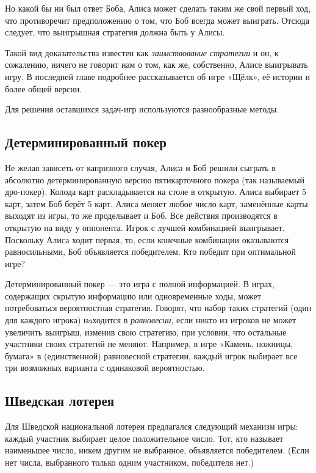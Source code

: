 Но какой бы ни был ответ Боба, Алиса может сделать таким же свой первый ход, что противоречит предположению о том, что Боб всегда может выиграть.
Отсюда следует,
что выигрышная стратегия должна быть у Алисы.
\heart

Такой вид доказательства известен как \emph{заимствование стратегии} и он, к сожалению, ничего не говорит нам о том, как же, собственно, Алисе выигрывать игру.
В последней главе подробнее рассказывается об игре «Щёлк», её истории и более общей версии.

\medskip

Для решения оставшихся задач-игр используются разнообразные методы.

\subsection*{Детерминированный покер}%

Не желая зависеть от капризного случая, Алиса и Боб решили сыграть в абсолютно детерминированную версию пятикарточного покера (так называемый дро-покер).
Колода карт раскладывается на столе в открытую.
Алиса выбирает 5 карт, затем Боб берёт 5 карт.
Алиса меняет любое число карт, заменённые карты выходят из игры, то же проделывает и Боб.
Все действия производятся в открытую на виду у оппонента.
Игрок с лучшей комбинацией выигрывает.
Поскольку Алиса ходит первая, то, если конечные комбинации оказываются равносильными, Боб объявляется победителем.
Кто победит при оптимальной игре?

\medskip

Детерминированный покер --- это игра с полной информацией.
В играх, содержащих скрытую информацию или одновременные ходы, может потребоваться вероятностная стратегия.
Говорят, что набор таких стратегий (один для каждого игрока) нaходится в \emph{равновесии}, если никто из игроков не может увеличить выигрыш, изменив свою стратегию, при условии, что остальные участники своих стратегий не меняют.
Например, в игре «Камень, ножницы, бумага» в (единственной) равновесной стратегии, каждый игрок выбирает все три возможных варианта с одинаковой вероятностью.

\subsection*{Шведская лотерея}%

Для Шведской национальной лотереи предлагался следующий механизм игры: каждый участник выбирает целое положительное число.
Тот, кто называет наименьшее число, никем другим не выбранное, объявляется победителем.
(Если нет числа, выбранного только одним участником, победителя нет.)

